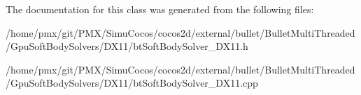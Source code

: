 The documentation for this class was generated from the following files\+:\begin{DoxyCompactItemize}
\item 
/home/pmx/git/\+P\+M\+X/\+Simu\+Cocos/cocos2d/external/bullet/\+Bullet\+Multi\+Threaded/\+Gpu\+Soft\+Body\+Solvers/\+D\+X11/bt\+Soft\+Body\+Solver\+\_\+\+D\+X11.\+h\item 
/home/pmx/git/\+P\+M\+X/\+Simu\+Cocos/cocos2d/external/bullet/\+Bullet\+Multi\+Threaded/\+Gpu\+Soft\+Body\+Solvers/\+D\+X11/bt\+Soft\+Body\+Solver\+\_\+\+D\+X11.\+cpp\end{DoxyCompactItemize}
